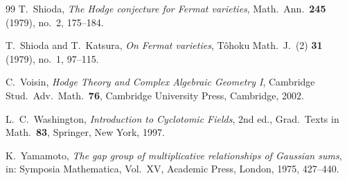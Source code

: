 \documentclass[11pt]{amsart}
\theoremstyle{definition}
\theoremstyle{remark}
\numberwithin{equation}{section}
\begin{document}
\begin{thebibliography}{99}
T.~Shioda, \emph{The Hodge conjecture for Fermat varieties}, Math.\ Ann.\ \textbf{245} (1979), no.~2, 175--184.

T.~Shioda and T.~Katsura, \emph{On Fermat varieties}, T\^ohoku Math.\ J.\ (2) \textbf{31} (1979), no.~1, 97--115.

C.~Voisin, \emph{Hodge Theory and Complex Algebraic Geometry I}, Cambridge Stud.\ Adv.\ Math.\ \textbf{76}, Cambridge University Press, Cambridge, 2002.

L.~C.~Washington, \emph{Introduction to Cyclotomic Fields}, 2nd ed., Grad.\ Texts in Math.\ \textbf{83}, Springer, New York, 1997.

K.~Yamamoto, \emph{The gap group of multiplicative relationships of Gaussian sums}, in: Symposia Mathematica, Vol.~XV, Academic Press, London, 1975, 427--440.

\end{thebibliography}
\end{document}
